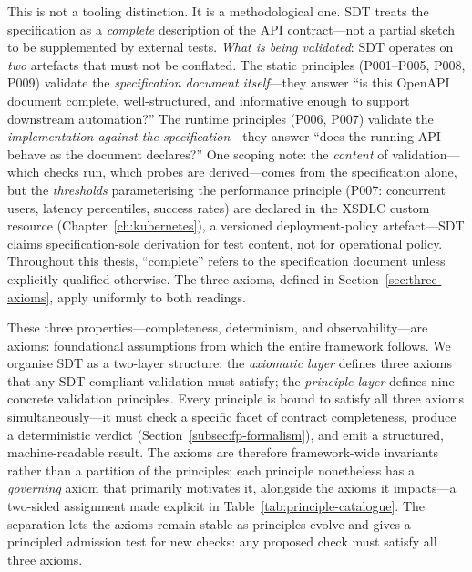 This is not a tooling distinction. It is a methodological one. SDT treats the specification as a \textit{complete} description of the API contract---not a partial sketch to be supplemented by external tests. \textit{What is being validated}: SDT operates on \emph{two} artefacts that must not be conflated. The static principles (P001--P005, P008, P009) validate the \emph{specification document itself}---they answer ``is this OpenAPI document complete, well-structured, and informative enough to support downstream automation?'' The runtime principles (P006, P007) validate the \emph{implementation against the specification}---they answer ``does the running API behave as the document declares?'' One scoping note: the \emph{content} of validation---which checks run, which probes are derived---comes from the specification alone, but the \emph{thresholds} parameterising the performance principle (P007: concurrent users, latency percentiles, success rates) are declared in the XSDLC custom resource (Chapter~\ref{ch:kubernetes}), a versioned deployment-policy artefact---SDT claims specification-sole derivation for test content, not for operational policy. Throughout this thesis, ``complete'' refers to the specification document unless explicitly qualified otherwise. The three axioms, defined in Section~\ref{sec:three-axioms}, apply uniformly to both readings.

These three properties---completeness, determinism, and observability---are axioms: foundational assumptions from which the entire framework follows. We organise SDT as a two-layer structure: the \textit{axiomatic layer} defines three axioms that any SDT-compliant validation must satisfy; the \textit{principle layer} defines nine concrete validation principles. Every principle is bound to satisfy all three axioms simultaneously---it must check a specific facet of contract completeness, produce a deterministic verdict (Section~\ref{subsec:fp-formalism}), and emit a structured, machine-readable result. The axioms are therefore framework-wide invariants rather than a partition of the principles; each principle nonetheless has a \emph{governing} axiom that primarily motivates it, alongside the axioms it impacts---a two-sided assignment made explicit in Table~\ref{tab:principle-catalogue}. The separation lets the axioms remain stable as principles evolve and gives a principled admission test for new checks: any proposed check must satisfy all three axioms.

